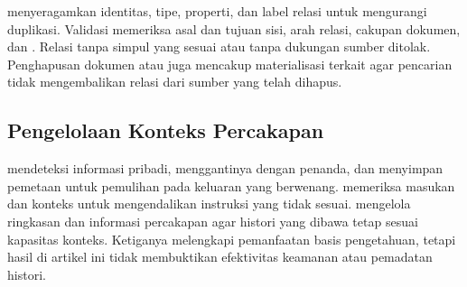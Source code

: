 menyeragamkan identitas, tipe, properti, dan label relasi untuk mengurangi duplikasi. Validasi memeriksa asal dan tujuan sisi, arah relasi, cakupan dokumen, dan . Relasi tanpa simpul yang sesuai atau tanpa dukungan sumber ditolak. Penghapusan dokumen atau  juga mencakup materialisasi terkait agar pencarian tidak mengembalikan relasi dari sumber yang telah dihapus.

\subsection{Pengelolaan Konteks Percakapan}
 mendeteksi informasi pribadi, menggantinya dengan penanda, dan menyimpan pemetaan untuk pemulihan pada keluaran yang berwenang.  memeriksa masukan dan konteks untuk mengendalikan instruksi yang tidak sesuai.  mengelola ringkasan dan informasi percakapan agar histori yang dibawa tetap sesuai kapasitas konteks. Ketiganya melengkapi pemanfaatan basis pengetahuan, tetapi hasil  di artikel ini tidak membuktikan efektivitas keamanan atau pemadatan histori.
